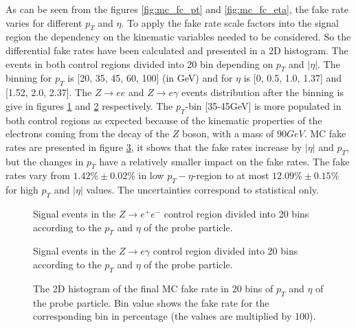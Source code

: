As can be seen from the figures \ref{fig:mc_fc_pt} and \ref{fig:mc_fc_eta}, the fake rate varies for different $p_{T}$ and $\eta$. To apply the fake rate scale factors into the signal region the dependency on the kinematic variables needed to be considered. So the differential fake rates have been calculated and presented in a 2D histogram. The events in both control regions divided into 20 bin depending on $p_{T}$ and $|\eta|$. The binning for $p_{T}$ is [20, 35, 45, 60, 100] (in GeV) and for $\eta$ is [0, 0.5, 1.0, 1.37] and [1.52, 2.0, 2.37]. The $Z\rightarrow ee$ and $Z\rightarrow e\gamma$ events distribution after the binning is give in figures \ref{fig:h2_mc_zee_probe} and \ref{fig:h2_mc_zeg_probe} respectively. The $p_{T}$-bin [35-45GeV] is more populated in both control regions as expected because of the kinematic properties of the electrons coming from the decay of the $Z$ boson, with a mass of $90GeV$. MC fake rates are presented in figure \ref{fig:h2_mc_fc}, it shows that the fake rates increase by $|\eta|$ and $p_{T}$, but the changes in $p_{T}$ have a relatively smaller impact on the fake rates. The fake rates vary from $1.42\%\pm0.02\%$ in low $p_{T}-\eta$-region to at most $12.09\%\pm0.15\%$ for high $p_{T}$ and $|\eta|$ values. The uncertainties correspond to statistical only.

\begin{figure}[H]
\begin{center}
\scalebox{0.6}{}
\caption{Signal events in the $Z \rightarrow e^{+}e^{-}$ control region divided into 20 bins according to the $p_{T}$ and $\eta$ of the probe particle.}
\label{fig:h2_mc_zee_probe}
\end{center}
\end{figure}

\begin{figure}[H]
\begin{center}
\scalebox{0.6}{}
\caption{Signal events in the $Z \rightarrow e\gamma$ control region divided into 20 bins according to the $p_{T}$ and $\eta$ of the probe particle.}
\label{fig:h2_mc_zeg_probe}
\end{center}
\end{figure}

\begin{figure}[H]
\begin{center}
\scalebox{0.6}{}
\caption{The 2D histogram of the final MC fake rate in 20 bins of $p_{T}$ and $\eta$ of the probe particle. Bin value shows the fake rate for the corresponding bin in percentage (the values are multiplied by 100).}
\label{fig:h2_mc_fc}
\end{center}
\end{figure}


